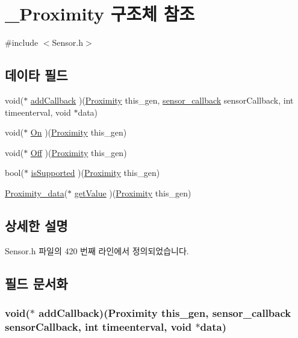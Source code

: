 \hypertarget{struct___proximity}{\section{\-\_\-\-Proximity 구조체 참조}
\label{struct___proximity}
}


{\ttfamily \#include $<$Sensor.\-h$>$}

\subsection*{데이타 필드}
\begin{DoxyCompactItemize}
\item 
void($\ast$ \hyperlink{struct___proximity_a6d46869067f8f072514623e8dbc86cfa}{add\-Callback} )(\hyperlink{_sensor_8h_a6ba1e9dd519249c4112807daf04e17e5}{Proximity} this\-\_\-gen, \hyperlink{_sensor_8h_ad8114207845fc5e0aa30832f0c718cd6}{sensor\-\_\-callback} sensor\-Callback, int timeenterval, void $\ast$data)
\item 
void($\ast$ \hyperlink{struct___proximity_a4a9a95df8401d22845c7cc21392de00a}{On} )(\hyperlink{_sensor_8h_a6ba1e9dd519249c4112807daf04e17e5}{Proximity} this\-\_\-gen)
\item 
void($\ast$ \hyperlink{struct___proximity_a25912193ba611f9680ac4e897f0d4489}{Off} )(\hyperlink{_sensor_8h_a6ba1e9dd519249c4112807daf04e17e5}{Proximity} this\-\_\-gen)
\item 
bool($\ast$ \hyperlink{struct___proximity_adfb2002e855b02ccf6f3dbcd636723ea}{is\-Supported} )(\hyperlink{_sensor_8h_a6ba1e9dd519249c4112807daf04e17e5}{Proximity} this\-\_\-gen)
\item 
\hyperlink{_sensor_8h_a662d5923038d3329cc0219faaed6ddf3}{Proximity\-\_\-data}($\ast$ \hyperlink{struct___proximity_abf3276a84c1e43e8e5ff5ecb6c665ee1}{get\-Value} )(\hyperlink{_sensor_8h_a6ba1e9dd519249c4112807daf04e17e5}{Proximity} this\-\_\-gen)
\end{DoxyCompactItemize}


\subsection{상세한 설명}


Sensor.\-h 파일의 420 번째 라인에서 정의되었습니다.



\subsection{필드 문서화}
\hypertarget{struct___proximity_a6d46869067f8f072514623e8dbc86cfa}{
\subsubsection[{add\-Callback}]{\setlength{\rightskip}{0pt plus 5cm}void($\ast$  add\-Callback)({\bf Proximity} this\-\_\-gen, {\bf sensor\-\_\-callback} sensor\-Callback, int timeenterval, void $\ast$data)}}\label{struct___proximity_a6d46869067f8f072514623e8dbc86cfa}


